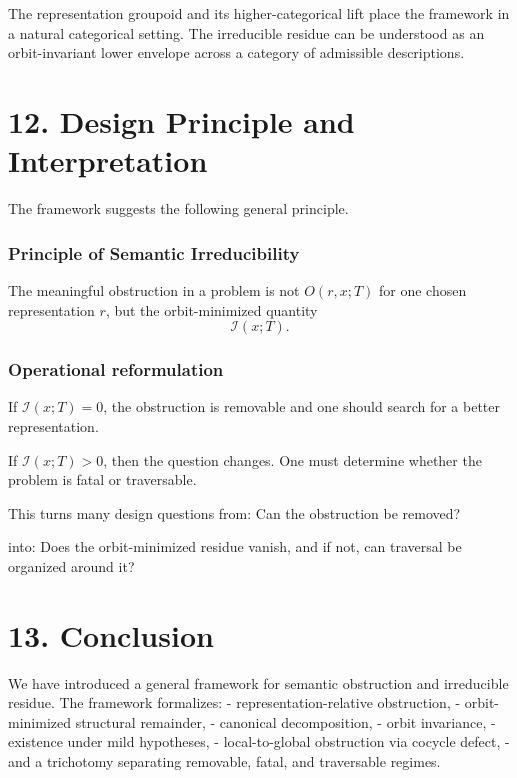 \documentclass[
]{article}
\begin{document}
The representation groupoid and its higher-categorical lift place the
framework in a natural categorical setting. The irreducible residue can
be understood as an orbit-invariant lower envelope across a category of
admissible descriptions.

\section{12. Design Principle and
Interpretation}\label{design-principle-and-interpretation}

The framework suggests the following general principle.

\subsubsection{Principle of Semantic
Irreducibility}\label{principle-of-semantic-irreducibility}

The meaningful obstruction in a problem is not \(O(r,x;T)\) for one
chosen representation \(r\), but the orbit-minimized quantity \[
\mathcal{I}(x;T).
\]

\subsubsection{Operational
reformulation}\label{operational-reformulation}

If \(\mathcal{I}(x;T)=0\), the obstruction is removable and one should
search for a better representation.

If \(\mathcal{I}(x;T)>0\), then the question changes. One must determine
whether the problem is fatal or traversable.

This turns many design questions from: Can the obstruction be removed?

into: Does the orbit-minimized residue vanish, and if not, can traversal
be organized around it?

\section{13. Conclusion}\label{conclusion}

We have introduced a general framework for semantic obstruction and
irreducible residue. The framework formalizes: - representation-relative
obstruction, - orbit-minimized structural remainder, - canonical
decomposition, - orbit invariance, - existence under mild hypotheses, -
local-to-global obstruction via cocycle defect, - and a trichotomy
separating removable, fatal, and traversable regimes.
\end{document}
